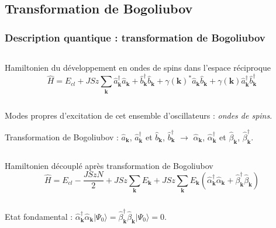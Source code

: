 \documentclass[10pt,a4paper]{beamer}
\newcommand{\an}{\hat{a}}
\newcommand{\cre}{\hat{a}^\dagger}
\newcommand{\h}{\ensuremath{\hat{H}}\xspace}
\newcommand{\ban}{\hat{b}}
\newcommand{\bcre}{\hat{b}^\dagger}
\newcommand{\fond}{\ensuremath{| \Psi_0 \rangle}\xspace}
\newcommand{\ond}{\ensuremath{\mathbf{k}\xspace}}
\newcommand{\ank}{\an_{\ond}}
\newcommand{\crek}{\cre_{\ond}}
\newcommand{\bank}{\ban_{\ond}}
\newcommand{\bcrek}{\bcre_{\ond}}
\newcommand{\gam}{\gamma(\ond{})}
\newcommand{\alcre}{\hat{\alpha}^\dagger_{\ond}}
\newcommand{\alan}{\hat{\alpha}_{\ond}}
\newcommand{\betcre}{\hat{\beta}^\dagger_{\ond}}
\newcommand{\betan}{\hat{\beta}_{\ond}}
\newcommand{\1}{\ensuremath{\ket{\om_1\bom_1}}\xspace}
\newcommand{\2}{\ensuremath{\ket{\om_2\bom_2}}\xspace}
\begin{document}
\subsection{Transformation de Bogoliubov}
\begin{frame}
\frametitle{Description quantique : transformation de Bogoliubov}

\begin{columns}
  \begin{column}{12cm}
  \begin{block}{Hamiltonien du développement en ondes de spins dans l'espace réciproque}
  	\begin{equation}
	\h=E_{cl}+JSz\sum_{\ond}\crek\ank+\bcrek\bank+\gam^*\ank\bank+\gam\crek\bcrek
	\end{equation}
  \end{block}
  \end{column}
\end{columns}

Modes propres d'excitation de cet ensemble d'oscillateurs : \emph{ondes de spins}.

Transformation de Bogoliubov : $\ank$, $\crek$ et $\bank$, $\bcrek$ $\rightarrow$ $\alan$, $\alcre$ et $\betan$, $\betcre$.
\begin{columns}
  \begin{column}{12cm}
  \begin{block}{Hamiltonien découplé après transformation de Bogoliubov}
  	\begin{equation}
	\h=E_{cl}-\frac{JSzN}{2}+JSz\sum_{\ond}E_{\ond}+JSz\sum_{\ond}E_{\ond}(\alcre\alan+\betcre\betan)
	\end{equation}
  \end{block}
  \end{column}
\end{columns}
Etat fondamental : $\alcre\alan\fond=\betcre\betan\fond=0$.
\end{frame}
\end{document}
